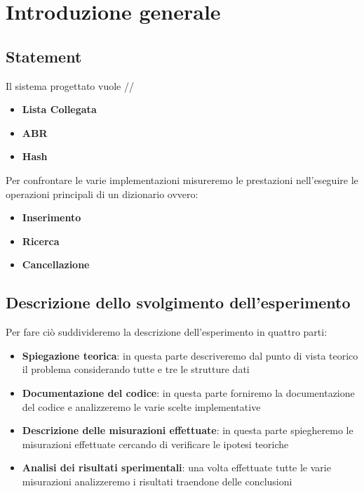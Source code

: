 \section{Introduzione generale}

\subsection{Statement}
Il sistema progettato vuole 
//
\begin{itemize}
    \item \textbf{Lista Collegata}
    \item \textbf{ABR}
    \item \textbf{Hash}
\end{itemize}
Per confrontare le varie implementazioni misureremo le prestazioni nell'eseguire le operazioni principali di un dizionario ovvero:
\begin{itemize}
    \item \textbf{Inserimento}
    \item \textbf{Ricerca}
    \item \textbf{Cancellazione}
\end{itemize}
\subsection{Descrizione dello svolgimento dell'esperimento}
Per fare ciò suddivideremo la descrizione dell'esperimento in quattro parti:
\begin{itemize}
    \item \textbf{Spiegazione teorica}: in questa parte descriveremo dal punto di vista teorico il problema considerando tutte e tre le strutture dati
    \item \textbf{Documentazione del codice}: in questa parte forniremo la documentazione del codice 
    e analizzeremo le varie scelte implementative
    \item \textbf{Descrizione delle misurazioni effettuate}: in questa parte spiegheremo le misurazioni effettuate cercando di verificare le ipotesi teoriche
    \item \textbf{Analisi dei risultati sperimentali}: una volta effettuate tutte le varie misurazioni analizzeremo i risultati traendone delle conclusioni
\end{itemize}
